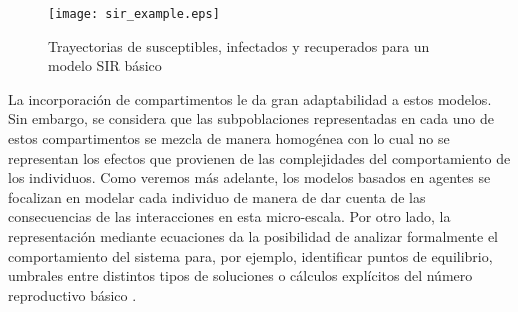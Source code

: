 \begin{figure}[h]
    \centering
    \texttt{[image: sir\_example.eps]}
    \caption{Trayectorias de susceptibles, infectados y recuperados para un modelo SIR básico}
    \label{fig:sir_example}
\end{figure}

La incorporación de compartimentos le da gran adaptabilidad a estos modelos. Sin embargo, se considera que las subpoblaciones representadas en cada uno de estos compartimentos se mezcla de manera homogénea con lo cual no se representan los efectos que provienen de las complejidades del comportamiento de los individuos. Como veremos más adelante, los modelos basados en agentes se focalizan en modelar cada individuo de manera de dar cuenta de las consecuencias de las interacciones en esta micro-escala. Por otro lado, la representación mediante ecuaciones da la posibilidad de analizar formalmente el comportamiento del sistema para, por ejemplo, identificar puntos de equilibrio, umbrales entre distintos tipos de soluciones o cálculos explícitos del número reproductivo básico \citep{Murray2007}.

